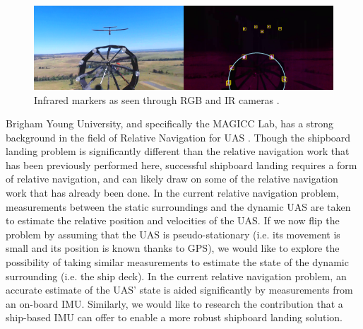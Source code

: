 \documentclass[12pt, letterpaper]{article}
\begin{document}
\begin{figure}[t] %
   \centering
   \includegraphics[trim = 0mm 0mm 0mm 0mm,clip,width=6in]{ir_drogue.png}
   \caption{Infrared markers as seen through RGB and IR cameras \cite{WilsonDB.2015}.}
   \label{fig:irmarkers}
\end{figure}

Brigham Young University, and specifically the MAGICC Lab, has a strong background in the field of Relative Navigation for UAS \cite{Leishman2013}.  Though the shipboard landing problem is significantly different than the relative navigation work that has been previously performed here, successful shipboard landing requires a form of relative navigation, and can likely draw on some of the relative navigation work that has already been done.  In the current relative navigation problem, measurements between the static surroundings and the dynamic UAS are taken to estimate the relative position and velocities of the UAS.  If we now flip the problem by assuming that the UAS is pseudo-stationary (i.e. its movement is small and its position is known thanks to GPS), we would like to explore the possibility of taking similar measurements to estimate the state of the dynamic surrounding (i.e. the ship deck). In the current relative navigation problem, an accurate estimate of the UAS' state is aided significantly by measurements from an on-board IMU. Similarly, we would like to research the contribution that a ship-based IMU can offer to enable a more robust shipboard landing solution.
\end{document}
